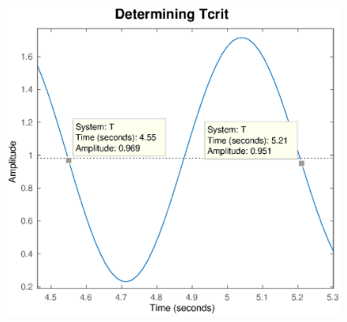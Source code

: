 \begin{figure}
    \centering
    \includegraphics[width=\imagewidth]{images/tcrit}
    \caption{}
\end{figure}


